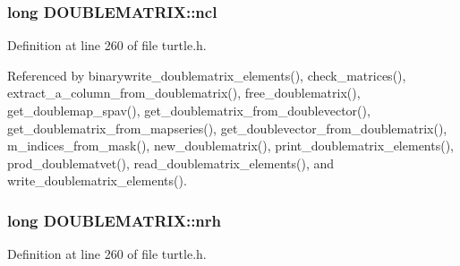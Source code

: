 \hypertarget{struct_d_o_u_b_l_e_m_a_t_r_i_x_aa079f8e820b50f702e78c75f462a429a}{
\subsubsection[{ncl}]{\setlength{\rightskip}{0pt plus 5cm}long D\-O\-U\-B\-L\-E\-M\-A\-T\-R\-I\-X\-::ncl}}\label{struct_d_o_u_b_l_e_m_a_t_r_i_x_aa079f8e820b50f702e78c75f462a429a}


Definition at line 260 of file turtle.\-h.



Referenced by binarywrite\-\_\-doublematrix\-\_\-elements(), check\-\_\-matrices(), extract\-\_\-a\-\_\-column\-\_\-from\-\_\-doublematrix(), free\-\_\-doublematrix(), get\-\_\-doublemap\-\_\-spav(), get\-\_\-doublematrix\-\_\-from\-\_\-doublevector(), get\-\_\-doublematrix\-\_\-from\-\_\-mapseries(), get\-\_\-doublevector\-\_\-from\-\_\-doublematrix(), m\-\_\-indices\-\_\-from\-\_\-mask(), new\-\_\-doublematrix(), print\-\_\-doublematrix\-\_\-elements(), prod\-\_\-doublematvet(), read\-\_\-doublematrix\-\_\-elements(), and write\-\_\-doublematrix\-\_\-elements().

\hypertarget{struct_d_o_u_b_l_e_m_a_t_r_i_x_a67fef4ae203dbb76bac4c2dbd166559c}{
\subsubsection[{nrh}]{\setlength{\rightskip}{0pt plus 5cm}long D\-O\-U\-B\-L\-E\-M\-A\-T\-R\-I\-X\-::nrh}}\label{struct_d_o_u_b_l_e_m_a_t_r_i_x_a67fef4ae203dbb76bac4c2dbd166559c}


Definition at line 260 of file turtle.\-h.



